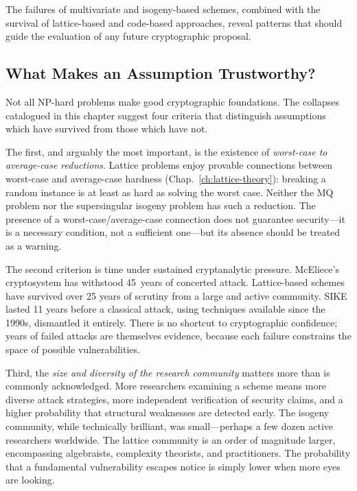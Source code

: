 The failures of multivariate and isogeny-based schemes, combined with the survival of lattice-based and code-based approaches, reveal patterns that should guide the evaluation of any future cryptographic proposal.

\subsection{What Makes an Assumption Trustworthy?}
\label{subsec:trustworthy}

Not all NP-hard problems make good cryptographic foundations.  The collapses catalogued in this chapter suggest four criteria that distinguish assumptions which have survived from those which have not.

The first, and arguably the most important, is the existence of \emph{worst-case to average-case reductions}.  Lattice problems enjoy provable connections between worst-case and average-case hardness (Chap.~\ref{ch:lattice-theory}): breaking a random instance is at least as hard as solving the worst case.  Neither the MQ problem nor the supersingular isogeny problem has such a reduction.  The presence of a worst-case/average-case connection does not guarantee security---it is a necessary condition, not a sufficient one---but its absence should be treated as a warning.

The second criterion is time under sustained cryptanalytic pressure.  McEliece's cryptosystem has withstood 45~years of concerted attack.  Lattice-based schemes have survived over 25 years of scrutiny from a large and active community.  SIKE lasted 11 years before a classical attack, using techniques available since the 1990s, dismantled it entirely.  There is no shortcut to cryptographic confidence; years of failed attacks are themselves evidence, because each failure constrains the space of possible vulnerabilities.

Third, the \emph{size and diversity of the research community} matters more than is commonly acknowledged.  More researchers examining a scheme means more diverse attack strategies, more independent verification of security claims, and a higher probability that structural weaknesses are detected early.  The isogeny community, while technically brilliant, was small---perhaps a few dozen active researchers worldwide.  The lattice community is an order of magnitude larger, encompassing algebraists, complexity theorists, and practitioners.  The probability that a fundamental vulnerability escapes notice is simply lower when more eyes are looking.

